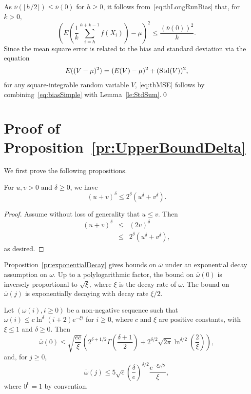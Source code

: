 \documentclass[a4paper,11pt]{article}
\begin{document}
As \(\overline{\nu}(\lfloor h/2\rfloor)\leq \overline{\nu}(0)\) for \(h\geq0\), it follows from~\eqref{eq:thLongRunBias} that, for \(k>0,\) \begin{equation}\label{eq:biasSimple}
(E(\frac{1}{k}\sum^{h+k-1}_{i=h}f(X_{i}))-\mu)^{2}\le\frac{(\overline{\nu}(0))^{2}}{k}.
\end{equation}Since the mean square error is related to the bias and standard deviation via the equation\begin{displaymath}
E((V-\mu)^{2})=(E(V)-\mu)^{2}+({\rm Std}(V))^{2},
\end{displaymath}for any square-integrable random variable \(V\), \eqref{eq:thMSE} follows by combining~\eqref{eq:biasSimple} with Lemma~\ref{le:StdSum}.\qed
\section{Proof of Proposition~\ref{pr:UpperBoundDelta}}
We first prove the following propositions.
\begin{proposition}\label{pr:MomentInequality}For \(u,v>0\) and \(\delta\geq0\), we have\begin{equation*}
(u+v)^{\delta}\leq2^{\delta}(u^{\delta}+v^{\delta}).
\end{equation*} 
\end{proposition}
\begin{proof}
Assume without loss of generality that \(u\leq v\). Then\begin{eqnarray*}(u+v)^{\delta}&\le&(2v)^{\delta}\\
&\le&2^{\delta}(u^{\delta}+v^{\delta}),\end{eqnarray*} as desired.    
\end{proof}
Proposition~\ref{pr:exponentialDecay} gives bounds on \(\overline{\omega}\) under an exponential decay assumption on \(\omega\). Up to a polylogarithmic factor, the bound on  \(\overline{\omega}(0)\) is inversely proportional to \(\sqrt{\xi}\), where \(\xi\) is the decay rate of \(\omega\). The bound on \(\overline{\omega}(j)\) is exponentially decaying with decay rate \(\xi/2\).  
\begin{proposition}\label{pr:exponentialDecay}Let \((\omega(i),i\geq0)\) be  a non-negative sequence such that \(\omega(i)\le c\ln^{\delta}(i+2) e^{-\xi i}\) for \(i\geq0\), where  \(c\) and \(\xi\) are positive constants, with \(\xi\leq1\) and \(\delta\ge0\). Then \begin{equation}\label{eq:S0upperBoundGen}
\overline{\omega}(0)\leq \sqrt{\frac{ec}{\xi}}\left(2^{\delta+1/2}\Gamma(\frac{\delta+1}{2})+2^{\delta/2}\sqrt{2\pi}\ln^{\delta/2}(\frac{2}{\xi})\right),
\end{equation}and, for \(j\geq 0\),
\begin{equation}\label{eq:SjUpperBoundGeom}
\overline{\omega}(j)\le5\sqrt{c}{\left(\frac{\delta}{e}\right)}^{\delta/2}\frac{e^{-\xi j/2}}{\xi},
\end{equation}
where \(0^{0}=1\) by convention.
\end{proposition}
\end{document}
